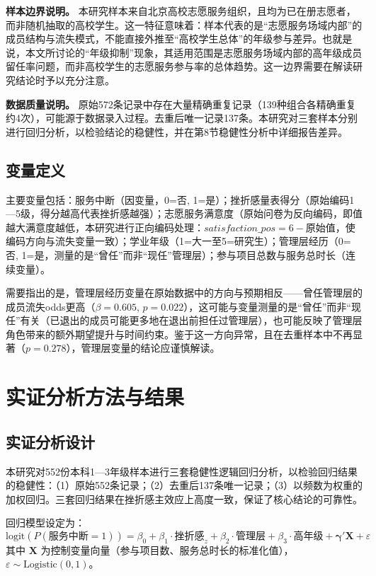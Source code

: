 \documentclass[12pt,a4paper]{article}
\begin{document}
\textbf{样本边界说明。} 本研究样本来自北京高校志愿服务组织，且均为已在册志愿者，而非随机抽取的高校学生。这一特征意味着：样本代表的是“志愿服务场域内部”的成员结构与流失模式，不能直接外推至“高校学生总体”的年级参与差异。也就是说，本文所讨论的“年级抑制”现象，其适用范围是志愿服务场域内部的高年级成员留任率问题，而非高校学生的志愿服务参与率的总体趋势。这一边界需要在解读研究结论时予以充分注意。

\textbf{数据质量说明。} 原始572条记录中存在大量精确重复记录（139种组合各精确重复约4次），可能源于数据录入过程。去重后唯一记录137条。本研究对三套样本分别进行回归分析，以检验结论的稳健性，并在第8节稳健性分析中详细报告差异。

\subsection{变量定义}

主要变量包括：服务中断（因变量，0=否, 1=是）；挫折感量表得分（原始编码1—5级，得分越高代表挫折感越强）；志愿服务满意度（原始问卷为反向编码，即值越大满意度越低，本研究进行正向编码处理：$satisfaction\_pos = 6 - 原始值$，使编码方向与流失变量一致）；学业年级（1=大一至5=研究生）；管理层经历（0=否, 1=是，测量的是“曾任”而非“现任”管理层）；参与项目总数与服务总时长（连续变量）。

需要指出的是，管理层经历变量在原始数据中的方向与预期相反——曾任管理层的成员流失odds更高（$\beta = 0.605$, $p = 0.022$），这可能与变量测量的是“曾任”而非“现任”有关（已退出的成员可能更多地在退出前担任过管理层），也可能反映了管理层角色带来的额外期望提升与时间约束。鉴于这一方向异常，且在去重样本中不再显著（$p = 0.278$），管理层变量的结论应谨慎解读。

\section{实证分析方法与结果}

\subsection{实证分析设计}

本研究对552份本科1—3年级样本进行三套稳健性逻辑回归分析，以检验回归结果的稳健性：（1）原始552条记录；（2）去重后137条唯一记录；（3）以频数为权重的加权回归。三套回归结果在挫折感主效应上高度一致，保证了核心结论的可靠性。

回归模型设定为：
\begin{equation}
\text{logit}(P(\text{服务中断}=1)) = \beta_0 + \beta_1 \cdot \text{挫折感}_z + \beta_2 \cdot \text{管理层} + \beta_3 \cdot \text{高年级} + \boldsymbol{\gamma}'\mathbf{X} + \varepsilon
\end{equation}
其中 $\mathbf{X}$ 为控制变量向量（参与项目数、服务总时长的标准化值），$\varepsilon \sim \text{Logistic}(0,1)$。
\end{document}
